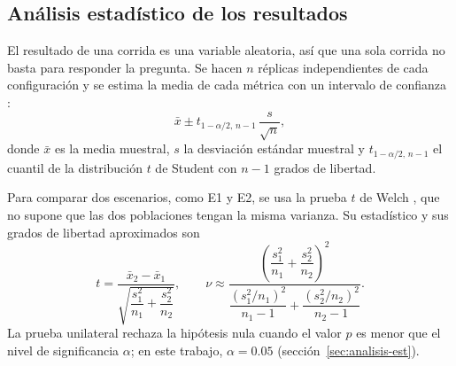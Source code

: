 \subsection{Análisis estadístico de los resultados}
\label{sec:marco-estadistica}

El resultado de una corrida es una variable aleatoria, así que una sola corrida no basta
para responder la pregunta. Se hacen $n$ réplicas independientes de cada configuración y
se estima la media de cada métrica con un intervalo de confianza
\cite{banks2010discrete}:
\[
\bar{x} \pm t_{1-\alpha/2,\, n-1}\, \frac{s}{\sqrt{n}},
\]
donde $\bar{x}$ es la media muestral, $s$ la desviación estándar muestral y
$t_{1-\alpha/2,\, n-1}$ el cuantil de la distribución $t$ de Student con $n - 1$ grados
de libertad.

Para comparar dos escenarios, como E1 y E2, se usa la prueba $t$ de Welch
\cite{welch1947generalization}, que no supone que las dos poblaciones tengan la misma
varianza. Su estadístico y sus grados de libertad aproximados son
\[
t = \frac{\bar{x}_2 - \bar{x}_1}{\sqrt{\dfrac{s_1^2}{n_1} + \dfrac{s_2^2}{n_2}}},
\qquad
\nu \approx
\frac{\left(\dfrac{s_1^2}{n_1} + \dfrac{s_2^2}{n_2}\right)^2}
{\dfrac{(s_1^2/n_1)^2}{n_1 - 1} + \dfrac{(s_2^2/n_2)^2}{n_2 - 1}}.
\]
La prueba unilateral rechaza la hipótesis nula cuando el valor $p$ es menor que el nivel
de significancia $\alpha$; en este trabajo, $\alpha = 0.05$
(sección~\ref{sec:analisis-est}).
